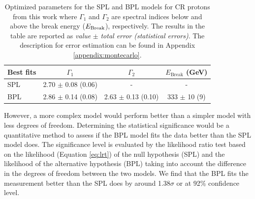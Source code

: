 \begin{table}[h!]
    \centering
    \begin{tabular}{l | c | c | c}
      Best fits & $\Gamma_1$ & $\Gamma_2$ & $E_{\text{Break}}$ (GeV) \\
      \hline \hline
      SPL & 2.70 $\pm$ 0.08 (0.06) & - & -  \\
      BPL & 2.86 $\pm$ 0.14 (0.08) & 2.63 $\pm$ 0.13 (0.10) & 333 $\pm$ 10 (9)
    \end{tabular}
    \caption{
        Optimized parameters for the SPL and BPL models for
        CR protons from this work where $\Gamma_1$ and $\Gamma_2$
        are spectral indices below and above
        the break energy ($E_{\rm Break}$), respectively.        
        The results in the table are reported as
        {\it value} $\pm$ {\it total error (statistical errors)}.
        The description for error estimation can be found 
        in Appendix \ref{appendix:montecarlo}.
    }
    \label{tb:bestfit}
\end{table}


However, a more complex model would perform better than
a simpler model with less degrees of freedom.
Determining the statistical significance
would be a quantitative method to assess if the BPL model fits
the data better than the SPL model does.
The significance level is evaluated by the likelihood ratio test
based on the likelihood (Equation \ref{eq:lrt}) of the null hypothesis (SPL)
and the likelihood of the alternative hypothesis (BPL)
taking into account the difference in the degrees of freedom between
the two models. 
We find that the BPL fits the measurement better than the SPL does by
around 1.38$\sigma$ or at 92\% confidence level.


